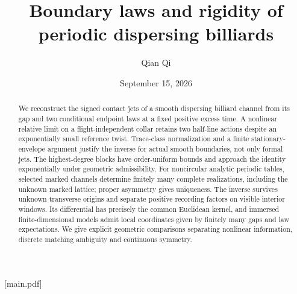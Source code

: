 
[main.pdf]
\title[Boundary laws and periodic rigidity]{Boundary laws and rigidity of periodic dispersing billiards}
\author{Qian Qi}
\date{September 15, 2026}


\begin{abstract}
We reconstruct the signed contact jets of a smooth dispersing billiard
channel from its gap and two conditional endpoint laws at a fixed positive
excess time. A nonlinear relative limit on a flight-independent collar
retains two half-line actions despite an exponentially small reference
twist. Trace-class normalization and a finite stationary-envelope argument
justify the inverse for actual smooth boundaries, not only formal jets.
The highest-degree blocks have order-uniform bounds and approach the
identity exponentially under geometric admissibility.
For noncircular analytic periodic tables, selected marked channels determine
finitely many complete realizations, including the unknown marked lattice;
proper asymmetry gives uniqueness. The inverse survives unknown transverse
origins and separate positive recording factors on visible interior windows.
Its differential has precisely the common Euclidean kernel, and immersed
finite-dimensional models admit local coordinates given by finitely many
gaps and law expectations. We give explicit geometric comparisons separating
nonlinear information, discrete matching ambiguity and continuous symmetry.
\end{abstract}
\maketitle
\setcounter{tocdepth}{1}
\tableofcontents

